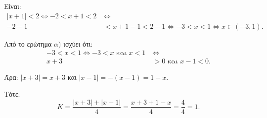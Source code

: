 
\begin{alist}
\item Είναι:
\begin{align*}
|x + 1| < 2 \Leftrightarrow -2 < x + 1 < 2 \ &\Leftrightarrow \\
-2 - 1 &< x + 1 - 1 < 2 - 1 \Leftrightarrow -3 < x < 1 \Leftrightarrow x \in (-3, 1).
\end{align*}

\item Από το ερώτημα $\alpha)$ ισχύει ότι:
\begin{align*}
-3 < x < 1 \Leftrightarrow -3 < x \text{ και } x < 1 \ &\Leftrightarrow \\
x + 3 &> 0 \text{ και } x - 1 < 0.
\end{align*}

Άρα:
$|x + 3| = x + 3$ και $|x - 1| = -(x - 1) = 1 - x$.

Τότε:
\[K = \dfrac{|x + 3| + |x - 1|}{4} = \dfrac{x + 3 + 1 - x}{4} = \dfrac{4}{4} = 1.\]
\end{alist}

